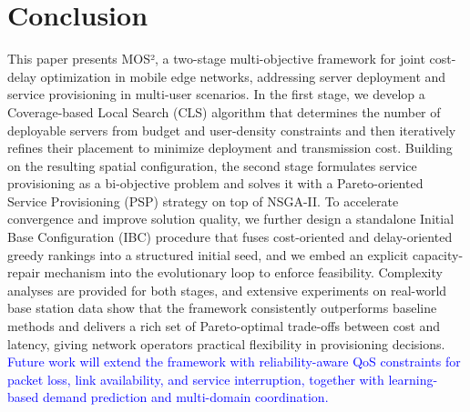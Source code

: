 \documentclass[10pt, conference, letterpaper]{IEEEtran}
\newcommand{\rev}[1]{\textcolor{blue}{#1}}
\newcommand{\rev}[1]{#1}
\begin{document}
\section{Conclusion}
 This paper presents MOS², a two-stage multi-objective framework for joint cost-delay optimization in mobile edge networks,
   addressing server deployment and service provisioning in multi-user scenarios. In the first stage, we develop a
  Coverage-based Local Search (CLS) algorithm that determines the number of deployable servers from budget and user-density
  constraints and then iteratively refines their placement to minimize deployment and transmission cost. Building on the
  resulting spatial configuration, the second stage formulates service provisioning as a bi-objective problem and solves it
  with a Pareto-oriented Service Provisioning (PSP) strategy on top of NSGA-II. To accelerate convergence and improve
  solution quality, we further design a standalone Initial Base Configuration (IBC) procedure that fuses cost-oriented and
  delay-oriented greedy rankings into a structured initial seed, and we embed an explicit capacity-repair mechanism into the
   evolutionary loop to enforce feasibility. Complexity analyses are provided for both stages, and extensive experiments on
  real-world base station data show that the framework consistently outperforms baseline methods and delivers a rich set of
  Pareto-optimal trade-offs between cost and latency, giving network operators practical flexibility in provisioning
  decisions. \rev{Future work will extend the framework with reliability-aware QoS constraints for packet loss, link availability, and service interruption, together with learning-based demand prediction and multi-domain coordination.}

\end{document}
